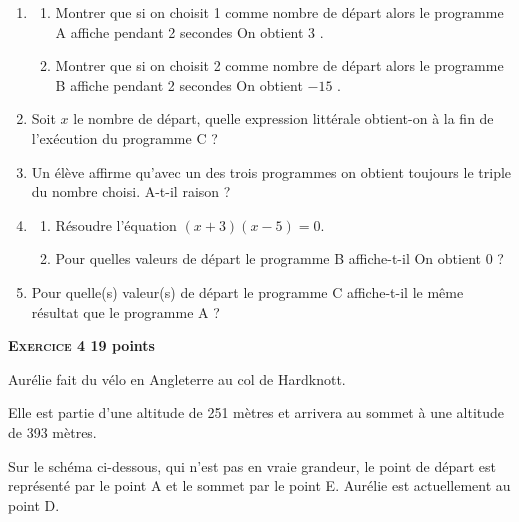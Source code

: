 \documentclass[11pt]{article}
\begin{document}
\begin{enumerate}
	\item \begin{enumerate}
		\item Montrer que si on choisit 1 comme nombre de départ alors le programme A affiche pendant 2 secondes \og On obtient 3 \fg.
		
		\item Montrer que si on choisit 2 comme nombre de départ alors le programme B affiche pendant 2 secondes \og On obtient $-15$ \fg.
	\end{enumerate}
	
	\item Soit $x$ le nombre de départ, quelle expression littérale obtient-on à la fin de l'exécution du programme C ?
	
	\item Un élève affirme qu'avec un des trois programmes on obtient toujours le triple du nombre choisi. A-t-il raison ?
	
	\item \begin{enumerate}
		\item Résoudre l'équation $(x + 3)(x - 5) = 0$.
		
		\item Pour quelles valeurs de départ le programme B affiche-t-il \og On obtient 0 \fg{} ?
	\end{enumerate}

	\item Pour quelle(s) valeur(s) de départ le programme C affiche-t-il le même résultat que le programme A ?
\end{enumerate}
\vspace{0,5cm}

\textbf{{\large \textsc{Exercice 4}} \hfill 19 points}

Aurélie fait du vélo en Angleterre au col de Hardknott.

Elle est partie d'une altitude de 251 mètres et arrivera au sommet à une altitude de 393 mètres.

Sur le schéma ci-dessous, qui n'est pas en vraie grandeur, le point de départ est représenté par le point A et le sommet par le point E. Aurélie est actuellement au point D. 
\end{document}
